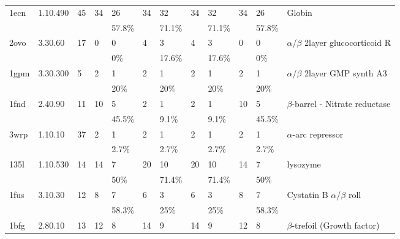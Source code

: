 \begin{sidewaystable}
\begin{center}
\begin{tabular}{llllllllllll}
1ecn  & 1.10.490      & 45    & 34    & 26    & 34    & 32    & 34    & 32    & 34    & 26    & Globin                                  \\
      &               &       &       & 57.8\%&       & 71.1\%&       & 71.1\%&       & 57.8\%&                                         \\
2ovo  & 3.30.60       & 17    & 0     & 0     & 4     & 3     & 4     & 3     & 0     & 0     & $\alpha$/$\beta$ 2layer glucocorticoid R\\
      &               &       &       & 0\%   &       & 17.6\%&       & 17.6\%&       & 0\%   &                                         \\
1gpm  & 3.30.300      & 5     & 2     & 1     & 2     & 1     & 2     & 1     & 2     & 1     & $\alpha$/$\beta$ 2layer GMP synth A3    \\
      &               &       &       & 20\%  &       & 20\%  &       & 20\%  &       & 20\%  &                                         \\
1fnd  & 2.40.90       & 11    & 10    & 5     & 2     & 1     & 2     & 1     & 10    & 5     & $\beta$-barrel - Nitrate reductase      \\
      &               &       &       & 45.5\%&       & 9.1\% &       & 9.1\% &       & 45.5\%&                                         \\
3wrp  & 1.10.10       & 37    & 2     & 1     & 2     & 1     & 2     & 1     & 2     & 1     & $\alpha$-arc repressor                  \\
      &               &       &       & 2.7\% &       & 2.7\% &       & 2.7\% &       & 2.7\% &                                         \\
135l  & 1.10.530      & 14    & 14    & 7     & 20    & 10    & 20    & 10    & 14    & 7     & lysozyme                                \\
      &               &       &       & 50\%  &       & 71.4\%&       & 71.4\%&       & 50\%  &                                         \\
1fus  & 3.10.30       & 12    & 8     & 7     & 6     & 3     & 6     & 3     & 8     & 7     & Cystatin B $\alpha$/$\beta$ roll        \\
      &               &       &       & 58.3\%&       & 25\%  &       & 25\%  &       & 58.3\%&                                         \\
1bfg  & 2.80.10       & 13    & 12    & 8     & 14    & 9     & 14    & 9     & 12    & 8     & $\beta$-trefoil (Growth factor)         \\

\end{tabular}
\end{center}
\end{sidewaystable}

